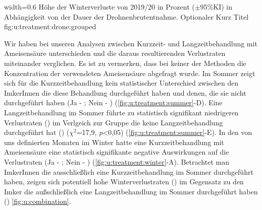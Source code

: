 {width=0.6\textwidth} %
{Höhe der Winterverluste von 2019/20 in Prozent ($\pm$95\%KI) in Abhängigkeit von der Dauer der Drohnenbrutentnahme.} %
{Optionaler Kurz Titel} %
{fig:u:treatment:drone:grouped} %



Wir haben bei unseren Analysen zwischen Kurzzeit- und Langzeitbehandlung mit Ameisensäure unterschieden und die daraus resultierenden Verlustraten miteinander verglichen. Es ist zu vermerken, dass bei keiner der Methoden die Konzentration der verwendeten Ameisensäure abgefragt wurde.
\newline
Im Sommer zeigt sich für die Kurzzeitbehandlung kein statistischer Unterschied zwischen den ImkerInnen die diese Behandlung durchgeführt haben und denen, die sie nicht durchgeführt haben (Ja - ; Nein - ) (\cref{fig:u:treatment:summer}-D). Eine Langzeitbehandlung im Sommer führte zu statistisch signifikant niedrigeren Verlustraten () im Verlgeich zur Gruppe die keine Langzeitbehandlung durchgeführt hat () ($\chi^{2}$=17,9, \textit{p}<0,05) (\cref{fig:u:treatment:summer}-E). In den von uns definierten Monaten im Winter hatte eine Kurzzeitbehandlung mit Ameisensäure eine statistisch signifikante negative Auswirkungen auf die Verlustraten (Ja - ; Nein - ) (\cref{fig:u:treatment:winter}-A).
\newline
Betrachtet man ImkerInnen die ausschließlich eine Kurzzeitbehandlung im Sommer durchgeführt haben, zeigen sich potentiell hohe Winterverlustraten () im Gegensatz zu den Imker die außschließlich eine Langzeitbehandlung im Sommer durchgeführt haben () \cref{fig:u:combination}.


